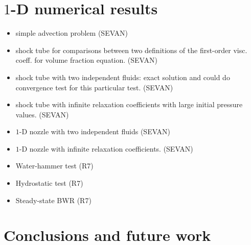 \documentclass[preprint,10pt]{elsarticle}
\begin{document}
\section{$1$-D numerical results}\label{sec:results}
%
\begin{itemize}
\item simple advection problem (SEVAN)
\item shock tube for comparisons between two definitions of the first-order visc. coeff. for volume fraction equation. (SEVAN)
\item shock tube with two independent fluids: exact solution and could do convergence test for this particular test. (SEVAN)
\item shock tube with infinite relaxation coefficients with large initial pressure values. (SEVAN)
\item $1$-D nozzle with two independent fluids (SEVAN)
\item $1$-D nozzle with infinite relaxation coefficients. (SEVAN)
\item Water-hammer test (R7)
\item Hydrostatic test (R7)
\item Steady-state BWR (R7)
\end{itemize}
\section{Conclusions and future work}\label{sec:conclusion}

\end{document}
